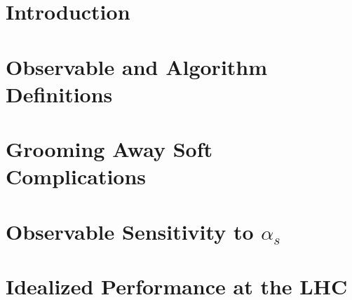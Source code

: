 \documentclass[11pt,letterpaper]{article}
\begin{document}
\maketitle

\section{Introduction}



\section{Observable and Algorithm Definitions}
\label{sec:definitions}



\section{Grooming Away Soft Complications}
\label{sec:softcomplications}



\section{Observable Sensitivity to $\alpha_s$}
\label{sec:jetmass}



\clearpage

\section{Idealized Performance at the LHC}
\label{sec:ben_study}




%

\end{document}
